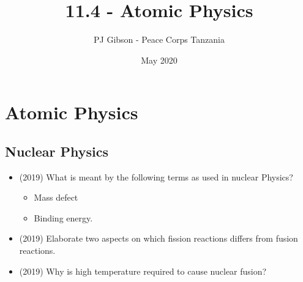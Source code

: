 \documentclass{article}
\title{11.4 - Atomic Physics}
\author{PJ Gibson - Peace Corps Tanzania}
\date{May 2020}
\begin{document}
\maketitle


\section{Atomic Physics}

\subsection{Nuclear Physics}
\begin{itemize}
\item (2019)  What is meant by the following terms as used in nuclear Physics?
 \begin{itemize}
\item Mass defect 
\item Binding energy. 
\end{itemize}
\item (2019)  Elaborate two aspects on which fission reactions differs from fusion reactions.
\item (2019)  Why is high temperature required to cause nuclear fusion? 
\end{itemize}
\end{document}
